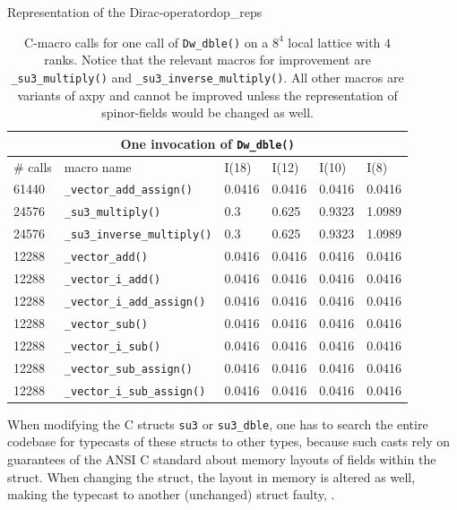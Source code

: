 \documentclass{article}
\theoremstyle{plain} %
\theoremstyle{convention} %
\theoremstyle{remark} %
\def\code#1{\texttt{#1}}
\numberwithin{equation}{section}
\begin{document}
\begin{proposal}{Representation of the Dirac-operator}{dop_reps}
\begin{table}[H]
\centering
    \begin{tabular}{ |p{1.2cm}|p{4cm}|p{1.2cm}|p{1.2cm}|p{1.2cm}|p{1.2cm}|  }
        \hline
        \multicolumn{6}{|c|}{One invocation of \code{Dw\_dble()}} \\
        \hline
        \# calls & macro name & I(18) & I(12) & I(10) & I(8) \\
        \hline
        61440 & \code{\_vector\_add\_assign()}    & 0.0416 & 0.0416 & 0.0416 & 0.0416 \\
        24576 & \code{\_su3\_multiply()}          & 0.3    & 0.625 & 0.9323 & 1.0989 \\
        24576 & \code{\_su3\_inverse\_multiply()} & 0.3    & 0.625 & 0.9323 & 1.0989 \\
        12288 & \code{\_vector\_add()}            & 0.0416 & 0.0416 & 0.0416 & 0.0416 \\
        12288 & \code{\_vector\_i\_add()}         & 0.0416 & 0.0416 & 0.0416 & 0.0416 \\
        12288 & \code{\_vector\_i\_add\_assign()} & 0.0416 & 0.0416 & 0.0416 & 0.0416 \\
        12288 & \code{\_vector\_sub()}            & 0.0416 & 0.0416 & 0.0416 & 0.0416 \\
        12288 & \code{\_vector\_i\_sub()}         & 0.0416 & 0.0416 & 0.0416 & 0.0416 \\
        12288 & \code{\_vector\_sub\_assign()}    & 0.0416 & 0.0416 & 0.0416 & 0.0416 \\
        12288 & \code{\_vector\_i\_sub\_assign()} & 0.0416 & 0.0416 & 0.0416 & 0.0416 \\
        \hline
    \end{tabular}
    \caption{C-macro calls for one call of \code{Dw\_dble()} on a $8^4$ local lattice with $4$ ranks. Notice that the relevant macros for improvement are \code{\_su3\_multiply()} and \code{\_su3\_inverse\_multiply()}. All other macros are variants of axpy and cannot be improved unless the representation of spinor-fields would be changed as well.}
    \label{tab:dw_dble}
\end{table}

When modifying the C structs \code{su3} or \code{su3\_dble}, one has to search the entire codebase for typecasts of these structs to other types, because such casts rely on guarantees of the ANSI C standard about memory layouts of fields within the struct. When changing the struct, the layout in memory is altered as well, making the typecast to another (unchanged) struct faulty, \cite{siff1999}.

\end{proposal}
\end{document}
